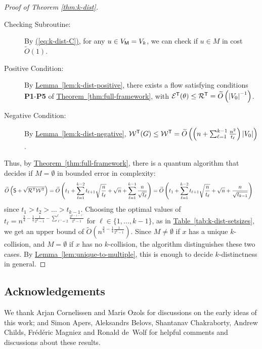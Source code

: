 \documentclass{article}
\newcommand{\eq}[1]{\hyperref[eq:#1]{(\ref*{eq:#1})}}
\newcommand{\thm}[1]{\hyperref[thm:#1]{Theorem~\ref*{thm:#1}}}
\newcommand{\lem}[1]{\hyperref[lem:#1]{Lemma~\ref*{lem:#1}}}
\newcommand{\tabl}[1]{\hyperref[tab:#1]{Table~\ref*{tab:#1}}}
\renewcommand{\>}{\rangle}
\newcommand{\<}{\langle}
\renewcommand{\(}{\left(}
\renewcommand{\)}{\right)}
\def\abs#1{\left| #1 \right|}
\begin{document}
\begin{proof}[Proof of Theorem \ref{thm:k-dist}]
\begin{description}
		\item[Checking Subroutine:] By \eq{k-dist-C}, for any $u\in V_{\sf M}=V_k$, we can check if $u\in M$ in cost $\widetilde{O}(1)$. 
		\item[Positive Condition:] By \lem{k-dist-positive}, there exists a flow satisfying conditions \textbf{P1}-\textbf{P5} of \thm{full-framework}, with ${\cal E}^{\sf T}(\theta)\leq {\cal R}^{\sf T}=\widetilde{O}\left(\abs{V_0}^{-1} \right)$. 
		\item[Negative Condition:] By \lem{k-dist-negative}, ${\cal W}^{\sf T}(G)\leq {\cal W}^{\sf T}=\widetilde{O}\left(\left(n  + \sum_{\ell=1}^{k-1} \frac{n^2}{t_{\ell}}\right)\abs{V_0}\right)$. 
	\end{description}
	Thus, by \thm{full-framework}, there is a quantum algorithm that decides if $M=\emptyset$ in bounded error in complexity:
	\begin{align*}
		\widetilde{O}\left({\sf S}+\sqrt{{\cal R}^{\sf T}{\cal W}^{\sf T}}\right) &
=\widetilde{O}\left(t_1+\sum_{\ell=1}^{k-2}t_{\ell+1}\sqrt{\frac{n}{t_{\ell}}}+\sqrt{n} + \sum_{\ell=1}^{k-1}\frac{n}{\sqrt{t_{\ell}}}\right)
=\widetilde{O}\left(t_1+\sum_{\ell=1}^{k-2}t_{\ell+1}\sqrt{\frac{n}{t_{\ell}}}+\sqrt{n} + \frac{n}{\sqrt{t_{k-1}}}\right)
	\end{align*}
since $t_1>t_2>\dots>t_{k-1}$.
Choosing the optimal values of $t_{\ell} = n^{\frac{3}{4}-\frac{1}{4}\frac{1}{2^k-1} - \sum_{\ell'=2}^{\ell}\frac{2^{k-1-\ell'}}{2^k-1}}$ for $\ell \in \{1,\dots,k-1\}$, as in \tabl{k-dist-setsizes}, we get an upper bound of $\widetilde{O}\left(n^{\frac{3}{4}-\frac{1}{4}\frac{1}{2^k-1}}\right)$.
Since $M\neq\emptyset$ if $x$ has a unique $k$-collision, and $M=\emptyset$ if $x$ has no $k$-collision, the algorithm distinguishes these two cases. By \lem{unique-to-multiple}, this is enough to decide $k$-distinctness in general.
\end{proof}



\subsection*{Acknowledgements}

We thank Arjan Cornelissen and Maris Ozols for discussions on the early ideas of this work; and Simon Apers, Aleksandrs Belovs, Shantanav Chakraborty, Andrew Childs, Fr\'ed\'eric Magniez
and Ronald de~Wolf for helpful comments and discussions about these results.

\newpage 


\end{document}
